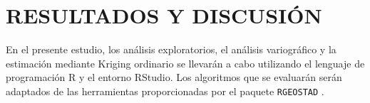\chapter{RESULTADOS Y DISCUSIÓN}

En el presente estudio, los análisis exploratorios, el análisis variográfico y la estimación mediante Kriging ordinario se llevarán a cabo utilizando el lenguaje de programación R y el entorno RStudio. Los algoritmos que se evaluarán serán adaptados de las herramientas proporcionadas por el paquete \texttt{RGEOSTAD} \cite{unknown}.

